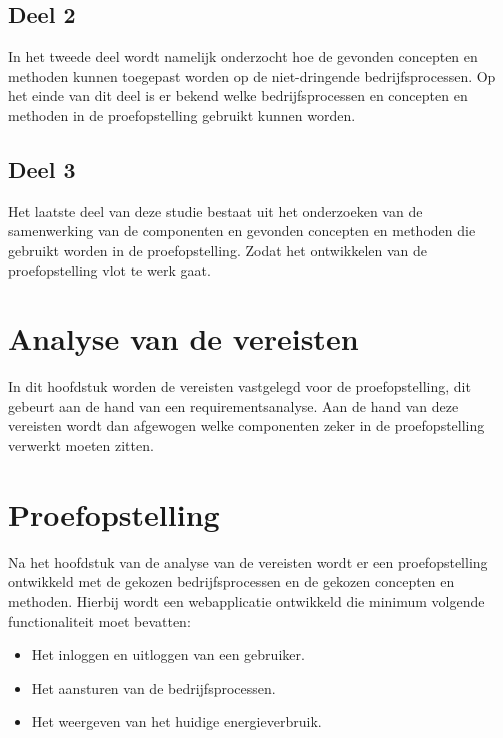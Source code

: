 \subsection{Deel 2}
\label{subsec:methodologie-literatuurstudie-deel2}

In het tweede deel wordt namelijk onderzocht hoe de gevonden concepten en methoden kunnen toegepast worden op de niet-dringende bedrijfsprocessen. Op het einde van dit deel is er bekend welke bedrijfsprocessen en concepten en methoden in de proefopstelling gebruikt kunnen worden.

\subsection{Deel 3}
\label{subsec:methodologie-literatuurstudie-deel3}

Het laatste deel van deze studie bestaat uit het onderzoeken van de samenwerking van de componenten en gevonden concepten en methoden die gebruikt worden in de proefopstelling. Zodat het ontwikkelen van de proefopstelling vlot te werk gaat.

\section{Analyse van de vereisten}
\label{sec:methodologie-analyse-vereisten}

In dit hoofdstuk worden de vereisten vastgelegd voor de proefopstelling, dit gebeurt aan de hand van een requirementsanalyse. Aan de hand van deze vereisten wordt dan afgewogen welke componenten zeker in de proefopstelling verwerkt moeten zitten.

\section{Proefopstelling}
\label{sec:methodologie-proefopstelling}

Na het hoofdstuk van de  analyse van de vereisten wordt er een proefopstelling ontwikkeld met de gekozen bedrijfsprocessen en de gekozen concepten en methoden. Hierbij wordt een webapplicatie ontwikkeld die minimum volgende functionaliteit moet bevatten:

\begin{itemize}
    \item Het inloggen en uitloggen van een gebruiker.
    \item Het aansturen van de bedrijfsprocessen.
    \item Het weergeven van het huidige energieverbruik.
\end{itemize}

